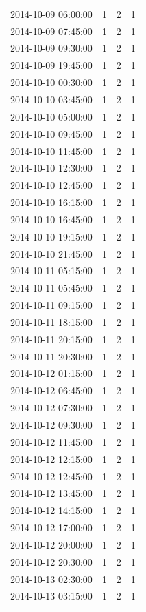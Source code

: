\begin{tabular}{lrrr}
2014-10-09 06:00:00 & 1 & 2 & 1 \\
2014-10-09 07:45:00 & 1 & 2 & 1 \\
2014-10-09 09:30:00 & 1 & 2 & 1 \\
2014-10-09 19:45:00 & 1 & 2 & 1 \\
2014-10-10 00:30:00 & 1 & 2 & 1 \\
2014-10-10 03:45:00 & 1 & 2 & 1 \\
2014-10-10 05:00:00 & 1 & 2 & 1 \\
2014-10-10 09:45:00 & 1 & 2 & 1 \\
2014-10-10 11:45:00 & 1 & 2 & 1 \\
2014-10-10 12:30:00 & 1 & 2 & 1 \\
2014-10-10 12:45:00 & 1 & 2 & 1 \\
2014-10-10 16:15:00 & 1 & 2 & 1 \\
2014-10-10 16:45:00 & 1 & 2 & 1 \\
2014-10-10 19:15:00 & 1 & 2 & 1 \\
2014-10-10 21:45:00 & 1 & 2 & 1 \\
2014-10-11 05:15:00 & 1 & 2 & 1 \\
2014-10-11 05:45:00 & 1 & 2 & 1 \\
2014-10-11 09:15:00 & 1 & 2 & 1 \\
2014-10-11 18:15:00 & 1 & 2 & 1 \\
2014-10-11 20:15:00 & 1 & 2 & 1 \\
2014-10-11 20:30:00 & 1 & 2 & 1 \\
2014-10-12 01:15:00 & 1 & 2 & 1 \\
2014-10-12 06:45:00 & 1 & 2 & 1 \\
2014-10-12 07:30:00 & 1 & 2 & 1 \\
2014-10-12 09:30:00 & 1 & 2 & 1 \\
2014-10-12 11:45:00 & 1 & 2 & 1 \\
2014-10-12 12:15:00 & 1 & 2 & 1 \\
2014-10-12 12:45:00 & 1 & 2 & 1 \\
2014-10-12 13:45:00 & 1 & 2 & 1 \\
2014-10-12 14:15:00 & 1 & 2 & 1 \\
2014-10-12 17:00:00 & 1 & 2 & 1 \\
2014-10-12 20:00:00 & 1 & 2 & 1 \\
2014-10-12 20:30:00 & 1 & 2 & 1 \\
2014-10-13 02:30:00 & 1 & 2 & 1 \\
2014-10-13 03:15:00 & 1 & 2 & 1 \\

\end{tabular}

